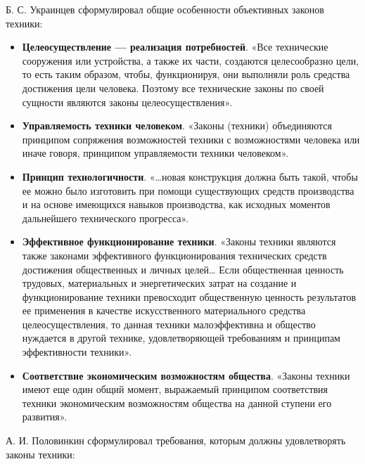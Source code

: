 \documentclass[11pt,a4paper]{article}
\begin{document}
Б. С. Украинцев сформулировал общие особенности объективных законов техники:
\begin{itemize}
\item \textbf{Целеосуществление — реализация потребностей}. «Все технические
  сооружения или устройства, а также их части, создаются целесообразно цели,
  то есть таким образом, чтобы, функционируя, они выполняли роль средства
  достижения цели человека. Поэтому все технические законы по своей сущности
  являются законы целеосуществления».
\item \textbf{Управляемость техники человеком}. «Законы (техники) объединяются
  принципом сопряжения возможностей техники с возможностями человека или иначе
  говоря, принципом управляемости техники человеком».
\item \textbf{Принцип технологичности}. «…новая конструкция должна быть такой,
  чтобы ее можно было изготовить при помощи существующих средств производства
  и на основе имеющихся навыков производства, как исходных моментов
  дальнейшего технического прогресса».
\item \textbf{Эффективное функционирование техники}. «Законы техники являются
  также законами эффективного функционирования технических средств достижения
  общественных и личных целей… Если общественная ценность трудовых,
  материальных и энергетических затрат на создание и функционирование техники
  превосходит общественную ценность результатов ее применения в качестве
  искусственного материального средства целеосуществления, то данная техники
  малоэффективна и общество нуждается в другой технике, удовлетворяющей
  требованиям и принципам эффективности техники».
\item \textbf{Соответствие экономическим возможностям общества}. «Законы
  техники имеют еще один общий момент, выражаемый принципом соответствия
  техники экономическим возможностям общества на данной ступени его развития».
\end{itemize}
А. И. Половинкин сформулировал требования, которым должны удовлетворять законы
техники:
\end{document}
